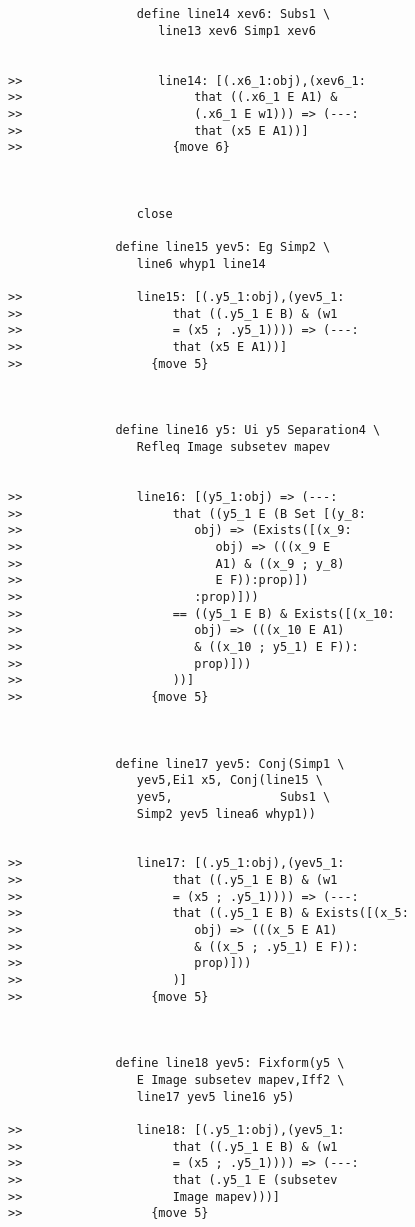 \documentclass[12pt]{article}
\begin{document}
\begin{verbatim}
                  define line14 xev6: Subs1 \
                     line13 xev6 Simp1 xev6


>>                   line14: [(.x6_1:obj),(xev6_1:
>>                        that ((.x6_1 E A1) &
>>                        (.x6_1 E w1))) => (---:
>>                        that (x5 E A1))]
>>                     {move 6}



                  close

               define line15 yev5: Eg Simp2 \
                  line6 whyp1 line14

>>                line15: [(.y5_1:obj),(yev5_1:
>>                     that ((.y5_1 E B) & (w1
>>                     = (x5 ; .y5_1)))) => (---:
>>                     that (x5 E A1))]
>>                  {move 5}



               define line16 y5: Ui y5 Separation4 \
                  Refleq Image subsetev mapev


>>                line16: [(y5_1:obj) => (---:
>>                     that ((y5_1 E (B Set [(y_8:
>>                        obj) => (Exists([(x_9:
>>                           obj) => (((x_9 E
>>                           A1) & ((x_9 ; y_8)
>>                           E F)):prop)])
>>                        :prop)]))
>>                     == ((y5_1 E B) & Exists([(x_10:
>>                        obj) => (((x_10 E A1)
>>                        & ((x_10 ; y5_1) E F)):
>>                        prop)]))
>>                     ))]
>>                  {move 5}



               define line17 yev5: Conj(Simp1 \
                  yev5,Ei1 x5, Conj(line15 \
                  yev5,               Subs1 \
                  Simp2 yev5 linea6 whyp1))


>>                line17: [(.y5_1:obj),(yev5_1:
>>                     that ((.y5_1 E B) & (w1
>>                     = (x5 ; .y5_1)))) => (---:
>>                     that ((.y5_1 E B) & Exists([(x_5:
>>                        obj) => (((x_5 E A1)
>>                        & ((x_5 ; .y5_1) E F)):
>>                        prop)]))
>>                     )]
>>                  {move 5}



               define line18 yev5: Fixform(y5 \
                  E Image subsetev mapev,Iff2 \
                  line17 yev5 line16 y5)

>>                line18: [(.y5_1:obj),(yev5_1:
>>                     that ((.y5_1 E B) & (w1
>>                     = (x5 ; .y5_1)))) => (---:
>>                     that (.y5_1 E (subsetev
>>                     Image mapev)))]
>>                  {move 5}




\end{verbatim}
\end{document}
